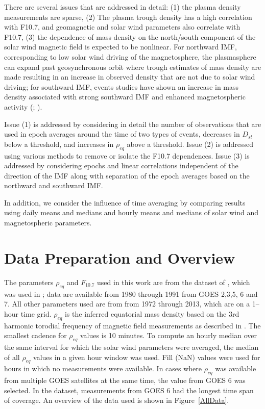 \documentclass[10pt,twocolumn]{article}
\begin{document}
There are several issues that are addressed in detail: (1) the plasma density measurements are sparse, (2) The plasma trough density has a high correlation with F10.7, and geomagnetic and solar wind parameters also correlate with F10.7, (3) the dependence of mass density on the north/south component of the solar wind magnetic field is expected to be nonlinear. For northward IMF, corresponding to low solar wind driving of the magnetosphere, the plasmasphere can expand past geosynchronous orbit where trough estimates of mass density are made resulting in an increase in observed density that are not due to solar wind driving; for southward IMF, events studies have shown an increase in mass density associated with strong southward IMF and enhanced magnetospheric activity (\cite{Takahashi2010}; \cite{Yao2008}).

Issue (1) is addressed by considering in detail the number of observations that are used in epoch averages around the time of two types of events, decreases in $D_{st}$ below a threshold, and increases in $\rho_{eq}$ above a threshold.  Issue (2) is addressed using various methods to remove or isolate the F10.7 dependences.  Issue (3) is addressed by considering epochs and linear correlations independent of the direction of the IMF along with separation of the epoch averages based on the northward and southward IMF.

In addition, we consider the influence of time averaging by comparing results using daily means and medians and hourly means and medians of solar wind and magnetospheric parameters.


\section{Data Preparation and Overview}

The parameters $\rho_{eq}$ and $F_{10.7}$ used in this work are from the dataset of \cite{Denton}, which was used in \cite{Takahashi2010}; data are available from 1980 through 1991 from GOES 2,3,5, 6 and 7.  All other parameters used are from \cite{Kondrashov2014ReconstructionOfGaps} from 1972 through 2013, which are on a 1--hour time grid. $\rho_{eq}$ is the inferred equatorial mass density based on the 3rd harmonic torodial frequency of magnetic field measurements as described in \cite{Takahashi2010}.  The smallest cadence for $\rho_{eq}$ values is 10 minutes.  To compute an hourly median over the same interval for which the solar wind parameters were averaged, the median of all $\rho_{eq}$ values in a given hour window was used.  Fill (NaN) values were used for hours in which no measurements were available.  In cases where $\rho_{eq}$ was available from multiple GOES satellites at the same time, the value from GOES 6 was selected.  In the dataset, measurements from GOES 6 had the longest time span of coverage.  An overview of the data used is shown in Figure~\ref{AllData}.
\end{document}
